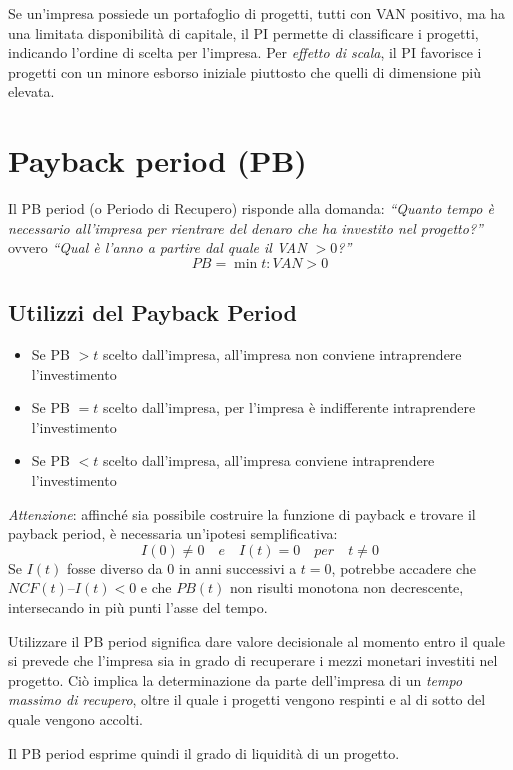 Se un’impresa possiede un portafoglio di progetti, tutti con VAN positivo, ma ha una limitata disponibilità
di capitale, il PI permette di classificare i progetti, indicando l’ordine di scelta per l’impresa. Per \emph{effetto di scala}, il PI favorisce i progetti con un minore esborso iniziale piuttosto che quelli di
dimensione più elevata.

\pagebreak
\section{Payback period (PB)}
Il PB period (o Periodo di Recupero) risponde alla domanda: \emph{``Quanto tempo è necessario all’impresa per
rientrare del denaro che ha investito nel progetto?''} ovvero \emph{``Qual è l’anno a partire dal quale il VAN $> 0$?''}
\[
PB = \min{t} : VAN > 0
\]

\subsection{Utilizzi del Payback Period}
\begin{itemize}
	\item Se PB $> t$ scelto dall’impresa, all’impresa non conviene intraprendere l’investimento
	\item Se PB $= t$ scelto dall’impresa, per l’impresa è indifferente intraprendere l’investimento
	\item Se PB $< t$ scelto dall’impresa, all’impresa conviene intraprendere l’investimento
\end{itemize}

\emph{Attenzione}: affinché sia possibile costruire la funzione di payback e trovare il payback period, è
necessaria un’ipotesi semplificativa:
\[
I(0) \ne 0 \quad \textit{e} \quad I(t) = 0 \quad \textit{per} \quad t \ne 0
\]
Se $I(t)$ fosse diverso da $0$ in anni successivi a $t=0$, potrebbe accadere che $NCF(t) – I(t) < 0$ e che $PB(t)$
non risulti monotona non decrescente, intersecando in più punti l’asse del tempo.

Utilizzare il PB period significa dare valore decisionale al momento entro il quale si prevede che l’impresa
sia in grado di recuperare i mezzi monetari investiti nel progetto.
Ciò implica la determinazione da parte dell’impresa di un \emph{tempo massimo di recupero}, oltre il quale i
progetti vengono respinti e al di sotto del quale vengono accolti.

Il PB period esprime quindi il grado di liquidità di un progetto.

